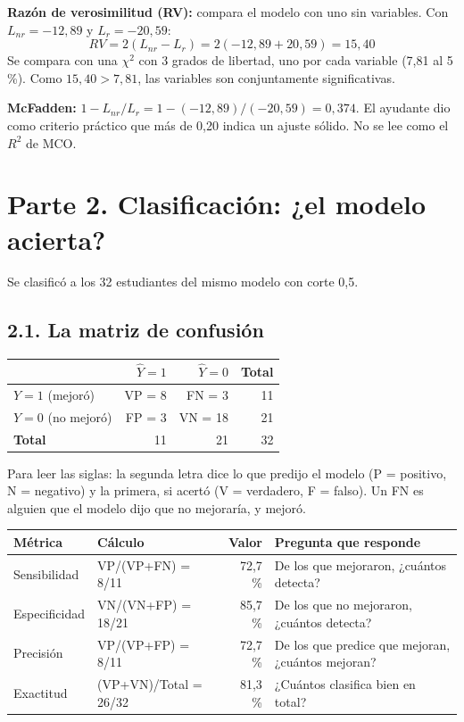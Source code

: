 \documentclass[11pt,letterpaper]{article}
\newcommand{\parte}[1]{\section*{\textcolor{azul}{#1}}}
\newcommand{\tema}[1]{\subsection*{#1}}
\begin{document}
\textbf{Razón de verosimilitud (RV):} compara el modelo con uno sin variables. Con $L_{nr}=-12{,}89$ y $L_r=-20{,}59$:
\[
RV=2(L_{nr}-L_r)=2(-12{,}89+20{,}59)=15{,}40
\]
Se compara con una $\chi^2$ con 3 grados de libertad, uno por cada variable (7,81 al 5 \%). Como $15{,}40>7{,}81$, las variables son conjuntamente significativas.

\textbf{McFadden:} $1-L_{nr}/L_r=1-(-12{,}89)/(-20{,}59)=0{,}374$. El ayudante dio como criterio práctico que más de 0,20 indica un ajuste sólido. No se lee como el $R^2$ de MCO.

\parte{Parte 2. Clasificación: ¿el modelo acierta?}

Se clasificó a los 32 estudiantes del mismo modelo con corte 0,5.

\tema{2.1. La matriz de confusión}

\begin{center}
\begin{tabular}{lrrr}
\toprule
& $\hat Y=1$ & $\hat Y=0$ & \textbf{Total} \\
\midrule
$Y=1$ (mejoró) & VP = 8 & FN = 3 & 11 \\
$Y=0$ (no mejoró) & FP = 3 & VN = 18 & 21 \\
\midrule
\textbf{Total} & 11 & 21 & 32 \\
\bottomrule
\end{tabular}
\end{center}

Para leer las siglas: la segunda letra dice lo que predijo el modelo (P = positivo, N = negativo) y la primera, si acertó (V = verdadero, F = falso). Un FN es alguien que el modelo dijo que no mejoraría, y mejoró.

\begin{center}
\small\begin{tabular}{llrl}
\toprule
\textbf{Métrica} & \textbf{Cálculo} & \textbf{Valor} & \textbf{Pregunta que responde} \\
\midrule
Sensibilidad & VP/(VP+FN) = 8/11 & 72,7 \% & De los que mejoraron, ¿cuántos detecta? \\
Especificidad & VN/(VN+FP) = 18/21 & 85,7 \% & De los que no mejoraron, ¿cuántos detecta? \\
Precisión & VP/(VP+FP) = 8/11 & 72,7 \% & De los que predice que mejoran, ¿cuántos mejoran? \\
Exactitud & (VP+VN)/Total = 26/32 & 81,3 \% & ¿Cuántos clasifica bien en total? \\
\bottomrule
\end{tabular}
\end{center}
\end{document}
